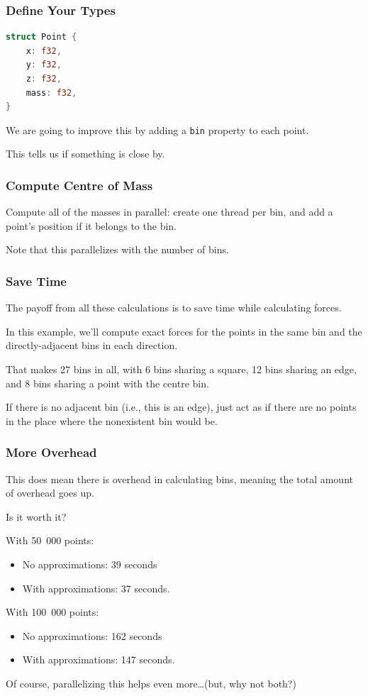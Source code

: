 \begin{frame}[fragile]
\frametitle{Define Your Types}

\begin{lstlisting}[language=Rust]
struct Point {
    x: f32,
    y: f32,
    z: f32,
    mass: f32,
}
\end{lstlisting}


We are going to improve this by adding a \texttt{bin} property to each point.

This tells us if something is close by.

\end{frame}



\begin{frame}[fragile]
\frametitle{Compute Centre of Mass}

Compute all of the masses in parallel: create one thread per bin, and add a point's
position if it belongs to the bin.


Note that this parallelizes with the number of bins.


\end{frame}

\begin{frame}
\frametitle{Save Time}

The payoff from all these calculations is to save time while calculating forces. 

In this example, we'll compute exact forces for the points in the same bin and the directly-adjacent bins in each direction.

That makes 27 bins in all, with 6 bins sharing a square, 12 bins sharing an edge, and 8 bins sharing a point with the centre bin. 

If there is no adjacent bin 
(i.e., this is an edge), just act as if there are no points 
in the place where the nonexistent bin would be. 

\end{frame}


\begin{frame}
\frametitle{More Overhead}

This does mean there is overhead in calculating bins, meaning the total amount of overhead goes up. 

Is it worth it? 

With 50~000 points:
\begin{itemize}
\item    No approximations: 39 seconds
\item    With approximations: 37 seconds.
\end{itemize}

With 100~000 points:
\begin{itemize}
\item    No approximations: 162 seconds
\item    With approximations: 147 seconds.
\end{itemize}

Of course, parallelizing this helps even more\ldots (but, why not both?)

\end{frame}




